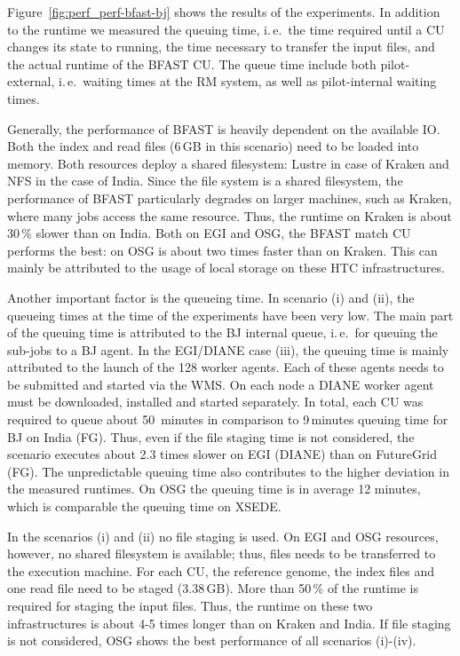 \documentclass[conference,final]{IEEEtran}
\newcommand{\cu}{CU\xspace}
\begin{document}
Figure~\ref{fig:perf_perf-bfast-bj} shows the results of the experiments. In
addition to the runtime we measured the queuing time, i.\,e.\ the time 
required until a \cu changes its state to running, the time necessary to 
transfer the input files, and the actual runtime of the BFAST \cu. The queue 
time include both pilot-external, i.\,e.\ waiting times at the RM system, as 
well as pilot-internal waiting times.

Generally, the performance of BFAST is
heavily dependent on the available IO. Both the index and read files (6\,GB in
this scenario) need to be loaded into memory. Both resources deploy a shared
filesystem: Lustre in case of Kraken and NFS in the case of India. Since the
file system is a shared filesystem, the performance of BFAST particularly 
degrades on larger machines, such as Kraken, where many jobs access the same 
resource. Thus, the runtime on Kraken is about 30\,\% slower than on India.
Both on EGI and OSG, the  BFAST match \cu performs the best: on OSG is about two 
times faster than on Kraken. This can mainly be attributed to the usage of local 
storage on these HTC infrastructures.

Another important factor is the queueing time. In scenario (i) and (ii), the
queueing times at the time of the experiments have been very low. The main part
of the queuing time is attributed to the BJ internal queue, i.\,e.\ for queuing
the sub-jobs to a BJ agent. In the EGI/DIANE case (iii), the queuing time is
mainly attributed to the launch of the 128 worker agents. Each of these agents
needs to be submitted and started via the WMS. On each node a DIANE worker agent
must be downloaded, installed and started separately. In total, each \cu was
required to queue about 50\, minutes in comparison to 9\,minutes queuing time
for BJ on India (FG). Thus, even if the file staging time is not considered, the
scenario executes about 2.3 times slower on EGI (DIANE) than on FutureGrid (FG).
The unpredictable queuing time also contributes to the higher deviation in the
measured runtimes. On OSG the queuing time is in average 12 minutes, which is
comparable the queuing time on XSEDE.

In the scenarios (i) and (ii) no file staging is used. On EGI and OSG resources,
however, no shared filesystem is available; thus, files needs to be transferred
to the execution machine. For each \cu, the reference genome, the index files
and one read file need to be staged (3.38\,GB). More than 50\,\% of the runtime
is required for staging the input files. Thus, the runtime on these two
infrastructures is about 4-5 times longer than on Kraken and India. If file
staging is not considered, OSG shows the best performance of all scenarios
(i)-(iv).
\end{document}
